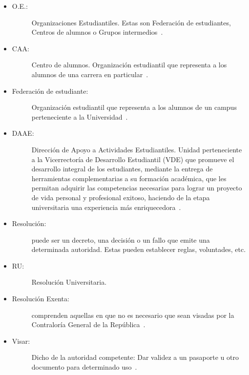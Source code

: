 \begin{itemize}
	\item 	\begin{description}
			    \item[O.E.:] Organizaciones Estudiantiles. Estas son Federación de estudiantes, Centros de alumnos o Grupos intermedios~\cite{2}.
			\end{description}

	\item 	\begin{description}
			    \item[CAA:] Centro de alumnos. Organización estudiantil que representa a los alumnos de una carrera en particular~\cite{3}.
			\end{description}

	\item 	\begin{description}
			    \item[Federación de estudiante:] Organización estudiantil que representa a los alumnos de un campus perteneciente a la Universidad~\cite{2}.
			\end{description}

	\item 	\begin{description}
				\item[DAAE:] Dirección de Apoyo a Actividades Estudiantiles. Unidad perteneciente a la Vicerrectoría de Desarrollo Estudiantil (VDE) que promueve el desarrollo integral de los estudiantes, mediante la entrega de herramientas complementarias a su formación académica, que les permitan adquirir las competencias necesarias para lograr un proyecto de vida personal y profesional exitoso, haciendo de la etapa universitaria una experiencia más enriquecedora~\cite{1}.
			\end{description}

	\item 	\begin{description}
			    \item[Resolución:] puede ser un decreto, una decisión o un fallo que emite una determinada autoridad. Estas pueden establecer reglas, voluntades, etc.
			\end{description}
	
	\item 	\begin{description}
				\item[RU:] Resolución Universitaria.
			\end{description}

	\item 	\begin{description}
			    \item[Resolución Exenta:] comprenden aquellas en que no es necesario que sean visadas por la Contraloría General de la República~\cite{3}.
			\end{description}

	\item 	\begin{description}
			    \item[Visar:] Dicho de la autoridad competente: Dar validez a un pasaporte u otro documento para determinado uso~\cite{4}.
			\end{description} 

\end{itemize}


